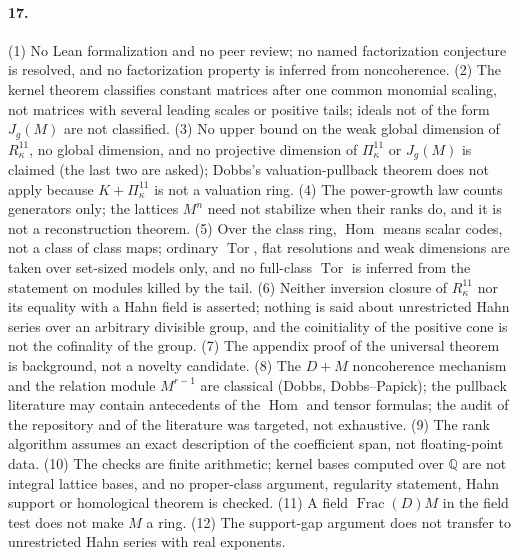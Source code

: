 \documentclass[11pt,letterpaper]{article}
\numberwithin{equation}{section}
\theoremstyle{definition}
\theoremstyle{remark}
\theoremstyle{plain}
\newcommand{\Q}{\mathbb Q}
\newcommand{\Hom}{\operatorname{Hom}}
\newcommand{\Frac}{\operatorname{Frac}}
\newcommand{\Tor}{\operatorname{Tor}}
\begin{document}
\paragraph{17.} (1) No Lean formalization and no peer review; no named factorization conjecture is resolved, and no factorization
property is inferred from noncoherence. (2) The kernel theorem classifies constant matrices after one common monomial scaling, not
matrices with several leading scales or positive tails; ideals not of the form $J_g(M)$ are not classified. (3) No upper bound on the
weak global dimension of $R^{11}_\kappa$, no global dimension, and no projective dimension of $\Pi^{11}_\kappa$ or $J_g(M)$ is claimed (the
last two are asked); Dobbs's valuation-pullback theorem does not apply because $K+\Pi^{11}_\kappa$ is not a valuation ring. (4) The
power-growth law counts generators only; the lattices $M^n$ need not stabilize when their ranks do, and it is not a reconstruction
theorem. (5) Over the class ring, $\Hom$ means scalar codes, not a class of class maps; ordinary $\Tor$, flat resolutions and weak
dimensions are taken over set-sized models only, and no full-class $\Tor$ is inferred from the statement on modules killed by the
tail. (6) Neither inversion closure of $R^{11}_\kappa$ nor its equality with a Hahn field is asserted; nothing is said about unrestricted
Hahn series over an arbitrary divisible group, and the coinitiality of the positive cone is not the cofinality of the group. (7) The
appendix proof of the universal theorem is background, not a novelty candidate. (8) The $D+M$ noncoherence mechanism and the relation
module $M^{r-1}$ are classical (Dobbs, Dobbs--Papick); the pullback literature may contain antecedents of the $\Hom$ and tensor formulas;
the audit of the repository and of the literature was targeted, not exhaustive. (9) The rank algorithm assumes an exact description
of the coefficient span, not floating-point data. (10) The checks are finite arithmetic; kernel bases computed over $\Q$ are not
integral lattice bases, and no proper-class argument, regularity statement, Hahn support or homological theorem is checked. (11) A
field $\Frac(D)M$ in the field test does not make $M$ a ring. (12) The support-gap argument does not transfer to unrestricted Hahn series
with real exponents.
\end{document}
